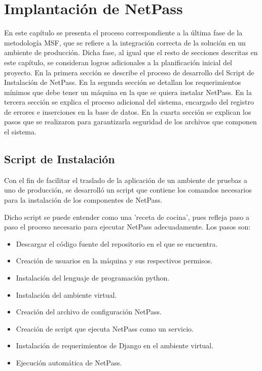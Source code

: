 \chapter{Implantación de NetPass}\label{chapter:Instalacion}
		En este capítulo se presenta el proceso  correspondiente a la última fase de la metodología MSF, que se refiere a la integración correcta de la solución en un ambiente de producción. Dicha fase, al igual que el resto de secciones descritas en este capítulo, se consideran logros adicionales a la planificación inicial del proyecto. En la primera sección se describe el proceso de desarrollo del Script de Instalación de NetPass. En la segunda sección se detallan los requerimientos mínimos que debe tener un máquina en la que se quiera instalar NetPass. En la tercera sección se explica el proceso adicional del sistema, encargado del registro de errores e inserciones en la base de datos. En la cuarta sección se explican los pasos que se realizaron para garantizarla seguridad de los archivos que componen el sistema.

\section{Script de Instalación} \label{sect:Script de Instalacion}
		Con el fin de facilitar el traslado de la aplicación de un ambiente de pruebas a uno de producción, se desarrolló un script que contiene los comandos necesarios para la instalación de los componentes de NetPass.
		
		Dicho script se puede entender como una 'receta de cocina', pues refleja paso a paso el proceso necesario para ejecutar NetPass adecuadamente. Los pasos son:
\begin{itemize}[noitemsep,nolistsep]
\item Descargar el código fuente del repositorio en el que se encuentra.
\item Creación de usuarios en la máquina y sus respectivos permisos.
\item Instalación del lenguaje de programación python.
\item Instalación del ambiente virtual.
\item Creación del archivo de configuración NetPass.
\item Creación de script que ejecuta NetPass como un servicio.
\item Instalación de requerimientos de Django en el ambiente virtual.
\item Ejecución automática de NetPass.
\end{itemize}

